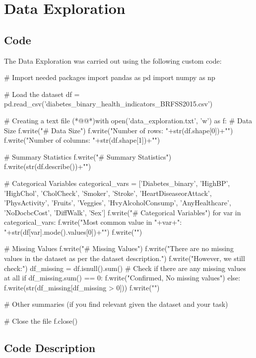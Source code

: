\documentclass[11pt]{article}
\begin{document}
\section{Data Exploration}
\subsection{{Code}}
The Data Exploration was carried out using the following custom code:

\begin{python}

# Import needed packages
import pandas as pd
import numpy as np

# Load the dataset
df = pd.read_csv('diabetes_binary_health_indicators_BRFSS2015.csv')

# Creating a text file
(*@@*)with open('data_exploration.txt', 'w') as f:
    # Data Size
    f.write("# Data Size\n")
    f.write("Number of rows: "+str(df.shape[0])+"\n")
    f.write("Number of columns: "+str(df.shape[1])+"\n\n")
    
    # Summary Statistics
    f.write("# Summary Statistics\n")
    f.write(str(df.describe())+"\n\n")
    
    # Categorical Variables
    categorical_vars = ['Diabetes_binary', 'HighBP', 'HighChol', 'CholCheck', 'Smoker', 'Stroke', 
                        'HeartDiseaseorAttack', 'PhysActivity', 'Fruits', 'Veggies', 'HvyAlcoholConsump',
                        'AnyHealthcare', 'NoDocbcCost', 'DiffWalk', 'Sex']
    f.write("# Categorical Variables\n")
    for var in categorical_vars:
        f.write("Most common value in "+var+": "+str(df[var].mode().values[0])+"\n")
    f.write("\n")

    # Missing Values
    f.write("# Missing Values\n")
    f.write("There are no missing values in the dataset as per the dataset description.")
    f.write("However, we still check:\n")
    df_missing = df.isnull().sum()
    # Check if there are any missing values at all
    if df_missing.sum() == 0:
        f.write("Confirmed, No missing values\n")
    else:
        f.write(str(df_missing[df_missing > 0]))
    f.write("\n\n")
    
    # Other summaries (if you find relevant given the dataset and your task)

# Close the file
f.close()

\end{python}

\subsection{Code Description}
\end{document}
